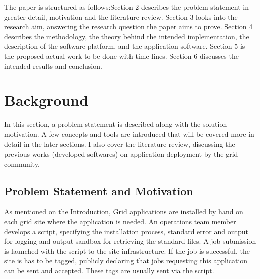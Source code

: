 \documentclass [titlepage,11pt]{article}
\begin{document}
The paper is structured as follows:Section 2 describes the problem statement in greater detail, motivation and the literature review. Section 3 looks into the research aim, answering the research question the paper aims to prove. Section 4 describes the methodology, the theory behind the intended implementation, the description of the software platform, and the application software. Section 5 is the proposed actual work to be done with time-lines. Section 6 discusses the intended results and conclusion. \\


\section{Background}

In this section, a problem statement is described along with the solution motivation. A few concepts and tools are introduced that will be covered more in detail in the later sections. I also cover the literature review, discussing the previous works (developed softwares) on application deployment by the grid community. 
\subsection{Problem Statement and Motivation}

As mentioned on the Introduction, Grid applications are installed by hand on each grid site where the application is needed. An operations team member develops a script, specifying the installation process, standard error and output for logging and output sandbox for retrieving the standard files. A job submission is launched with the script to the site infrastructure. If the job is successful, the site is has to be tagged, publicly declaring that jobs requesting this application can be sent and accepted. These tags are usually sent via the script. \\
\end{document}
